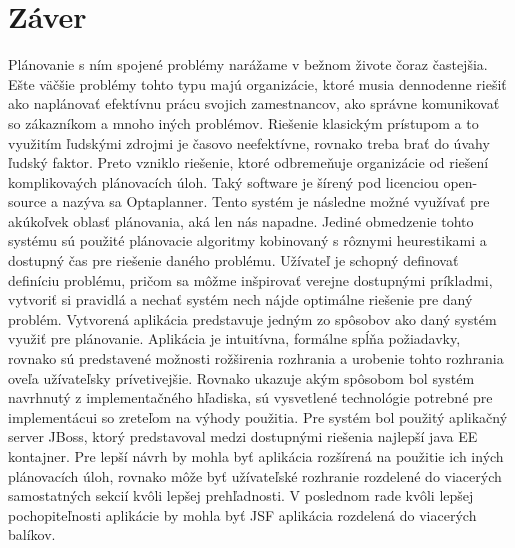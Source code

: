 \chapter{Záver}
Plánovanie s ním spojené problémy narážame v bežnom živote čoraz častejšia. Ešte väčšie problémy tohto typu majú organizácie, ktoré musia dennodenne riešiť ako naplánovať efektívnu prácu svojich zamestnancov, ako správne komunikovať so zákazníkom a mnoho iných problémov. Riešenie klasickým prístupom a to využitím ľudskými zdrojmi je časovo neefektívne, rovnako treba brať do úvahy ľudský faktor. Preto vzniklo riešenie, ktoré odbremeňuje organizácie od riešení komplikovaých plánovacích úloh. Taký software je šírený pod licenciou open-source a nazýva sa Optaplanner. Tento systém je následne možné využívať pre akúkoľvek oblasť plánovania, aká len nás napadne. Jediné obmedzenie tohto systému sú použité plánovacie algoritmy kobinovaný s rôznymi heurestikami a dostupný čas pre riešenie daného problému. Užívateľ je schopný definovať definíciu problému, pričom sa môžme inšpirovať verejne dostupnými príkladmi, vytvoriť si pravidlá a nechať systém nech nájde optimálne riešenie pre daný problém. Vytvorená aplikácia predstavuje jedným zo spôsobov ako daný systém využiť pre plánovanie. Aplikácia je intuitívna, formálne spĺňa požiadavky, rovnako sú predstavené možnosti rožširenia rozhrania a urobenie tohto rozhrania oveľa užívateľsky prívetivejšie.  Rovnako ukazuje akým spôsobom bol systém navrhnutý z implementačného hľadiska, sú vysvetlené technológie potrebné pre implementácui so zreteľom na výhody použitia. Pre systém bol použitý aplikačný server JBoss, ktorý predstavoval medzi dostupnými riešenia najlepší java EE kontajner. Pre lepší návrh by mohla byť aplikácia rozšírená na použitie ich iných plánovacích úloh, rovnako môže byť užívateľské rozhranie rozdelené do viacerých samostatných sekcií kvôli lepšej prehľadnosti. V poslednom rade kvôli lepšej pochopiteľnosti aplikácie by mohla byť JSF aplikácia rozdelená do viacerých balíkov.



